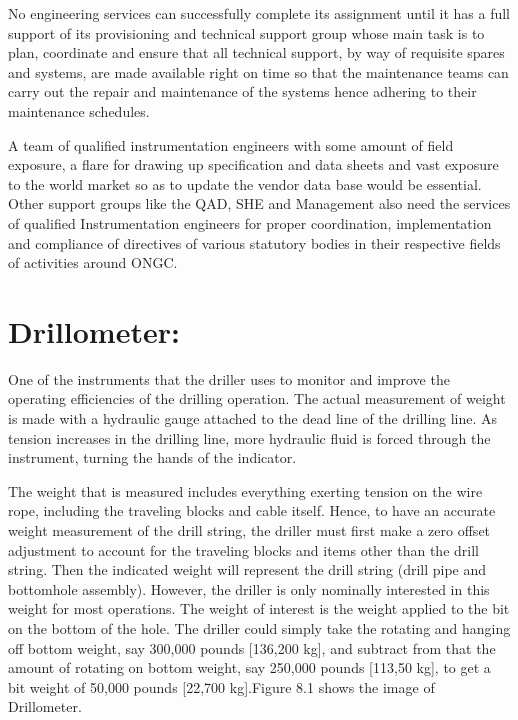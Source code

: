 No engineering services can successfully complete its assignment until it has a full support 
of its provisioning and technical support group whose main task is to plan, coordinate and ensure
that all technical support, by way of requisite spares and systems, are made available right on
time so that the maintenance teams can carry out the repair and maintenance of the systems hence
adhering to their maintenance schedules.

\vspace{1em}
A team of qualified instrumentation engineers with some amount of field exposure, 
a flare for drawing up specification and data sheets and vast exposure to the world market 
so as to update the vendor data base would be essential. Other support groups like the QAD, 
SHE and Management also need the services of qualified Instrumentation engineers for proper coordination, 
implementation and compliance of directives of various statutory bodies in their respective fields of 
activities around ONGC.

\section*{Drillometer:} 

One of the instruments that the driller uses to monitor
and improve the operating efficiencies of the drilling operation. The
actual measurement of weight is made with a hydraulic gauge
attached to the dead line of the drilling line. As tension increases in
the drilling line, more hydraulic fluid is forced through the
instrument, turning the hands of the indicator. 

\vspace{2em}

The weight that is measured includes everything exerting tension on the wire rope,
including the traveling blocks and cable itself. Hence, to have an
accurate weight measurement of the drill string, the driller must first
make a zero offset adjustment to account for the traveling blocks and
items other than the drill string. Then the indicated weight will
represent the drill string (drill pipe and bottomhole assembly).
However, the driller is only nominally interested in this weight for
most operations. The weight of interest is the weight applied to the
bit on the bottom of the hole. The driller could simply take the
rotating and hanging off bottom weight, say 300,000 pounds
[136,200 kg], and subtract from that the amount of rotating on bottom
weight, say 250,000 pounds [113,50 kg], to get a bit weight of
50,000 pounds [22,700 kg].Figure 8.1 shows the image of Drillometer.

